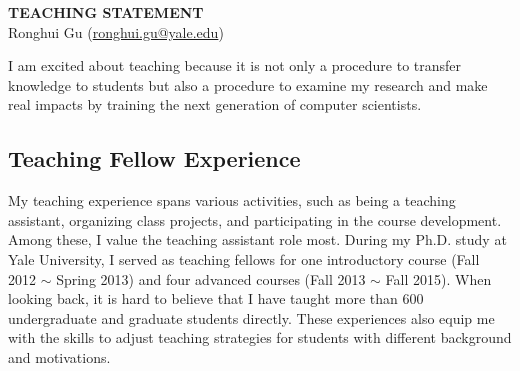 \documentclass[a4paper, 10pt]{article}
\newcommand*{\email}[1]{\normalsize\href{mailto:#1}{#1}}
\begin{document}
\thispagestyle{fancy}
\lhead{}
\rhead{}
\renewcommand{\headrulewidth}{0pt} 
\renewcommand{\footrulewidth}{0pt} 


\pagestyle{fancy}
\lhead{\textcolor{gray}{\it Ronghui Gu}}
\rhead{\textcolor{gray}{\thepage/\totalpages{}}}

\begin{small}

\begin{center}
{\LARGE \bf TEACHING STATEMENT}\\
\vspace*{0.2cm}
{\normalsize Ronghui Gu (\email{ronghui.gu@yale.edu})}
\end{center}




I am excited about teaching because it is not only a procedure to transfer knowledge to students
but also a procedure to examine my research and make real impacts by
training the next generation of computer scientists.

\subsection*{Teaching Fellow Experience}
My teaching experience spans various activities, 
such as being a teaching assistant, organizing 
class projects, and participating in the course development.
Among these, I value the teaching assistant role  most.
 During my Ph.D. study  at Yale University,
I served as teaching fellows for one introductory
course (Fall 2012 $\sim$ Spring 2013) and four advanced courses (Fall 2013 $\sim$ Fall 2015). When looking back, it is hard to believe that I have taught more than 600 undergraduate
and graduate students directly. 
These experiences also equip me with the skills
to adjust teaching strategies for students with different background and motivations.


\end{small}
\end{document}

